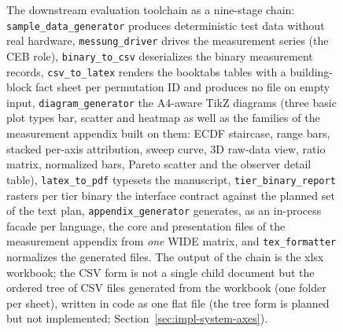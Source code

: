 \begin{nurlang}
\begin{figure}[htbp]
\caption[The downstream evaluation toolchain]{The downstream evaluation toolchain as a nine-stage
chain: \texttt{sample\_data\_generator} produces deterministic test data without real hardware,
\texttt{messung\_driver} drives the measurement series (the CEB role), \texttt{binary\_to\_csv}
deserializes the binary measurement records, \texttt{csv\_to\_latex} renders the booktabs tables with a
building-block fact sheet per permutation ID and produces no file on empty input,
\texttt{diagram\_generator} the A4-aware TikZ diagrams (three basic plot types bar, scatter and heatmap
as well as the families of the measurement appendix built on them: ECDF staircase, range bars, stacked
per-axis attribution, sweep curve, 3D raw-data view, ratio matrix, normalized bars, Pareto scatter and
the observer detail table), \texttt{latex\_to\_pdf}
typesets the manuscript, \texttt{tier\_binary\_report} rasters per tier binary the interface contract
against the planned set of the text plan, \texttt{appendix\_generator} generates, as an in-process
facade per language, the core and presentation files of the measurement appendix from \emph{one} WIDE
matrix, and \texttt{tex\_formatter} normalizes the generated files. The output of the chain is the xlsx
workbook; the CSV form is not a single child document but the ordered tree of CSV files generated from
the workbook (one folder per sheet), written in code as one flat file (the tree form is planned but not
implemented; Section~\ref{sec:impl-system-axes}).}\label{fig:toolchain}
\end{figure}


\end{nurlang}
